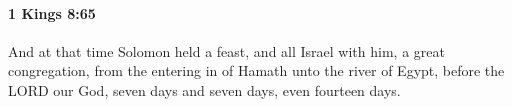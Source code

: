 
		\paragraph{1 Kings 8:65} %
			\label{1KINGS-8-65}

			And at that time Solomon held a feast, and all Israel with him, a great congregation, from the entering in of Hamath unto the river of Egypt, before the LORD our God, seven days and seven days, even fourteen days.


